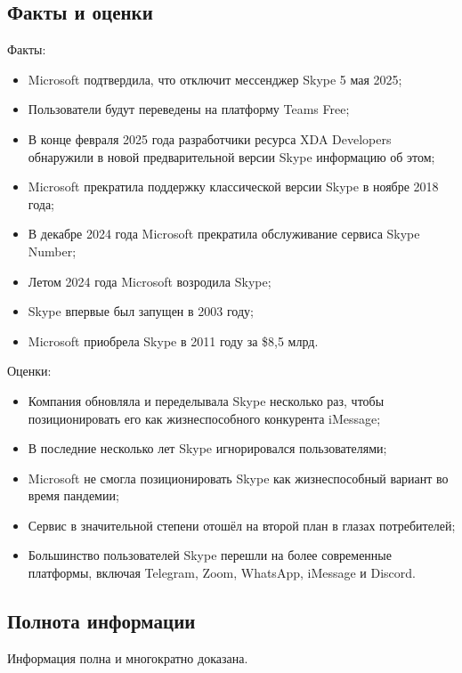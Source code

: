 \documentclass{bsuir}
\begin{document}
\subsection{Факты и оценки}
Факты:

\begin{itemize}
	\item
	      Microsoft подтвердила, что отключит мессенджер Skype 5 мая 2025;
	\item
	      Пользователи будут переведены на платформу Teams Free;
	\item
	      В конце февраля 2025 года разработчики ресурса XDA Developers обнаружили в
	      новой предварительной версии Skype информацию об этом;
	\item
	      Microsoft прекратила поддержку классической версии Skype в ноябре 2018 года;
	\item
	      В декабре 2024 года Microsoft прекратила обслуживание сервиса Skype Number;
	\item
	      Летом 2024 года Microsoft возродила Skype;
	\item
	      Skype впервые был запущен в 2003 году;
	\item
	      Microsoft приобрела Skype в 2011 году за \$8,5 млрд.
\end{itemize}

Оценки:

\begin{itemize}
	\item
	      Компания обновляла и переделывала Skype несколько раз, чтобы позиционировать
	      его как жизнеспособного конкурента iMessage;
	\item
	      В последние несколько лет Skype игнорировался пользователями;
	\item
	      Microsoft не смогла позиционировать Skype как жизнеспособный вариант во
	      время пандемии;
	\item
	      Сервис в значительной степени отошёл на второй план в глазах потребителей;
	\item
	      Большинство пользователей Skype перешли на более современные платформы,
	      включая Telegram, Zoom, WhatsApp, iMessage и Discord.
\end{itemize}

\subsection{Полнота информации}
Информация полна и многократно доказана.
\end{document}
